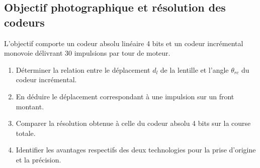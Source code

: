 \subsection{Objectif photographique et résolution des codeurs}

L'objectif comporte un codeur absolu linéaire 4 bits et un codeur
incrémental monovoie délivrant 30 impulsions par tour de moteur.

\begin{center}
\hfill
{}\hfill
{}
\end{center}

\begin{enumerate}
  \item Déterminer la relation entre le déplacement $d_l$ de la lentille et l'angle $\theta_{rc}$ du codeur incrémental.
  \item En déduire le déplacement correspondant à une impulsion sur un front montant.
  \item Comparer la résolution obtenue à celle du codeur absolu 4 bits sur la course totale.
  \item Identifier les avantages respectifs des deux technologies pour la prise d'origine et la précision.
\end{enumerate}
